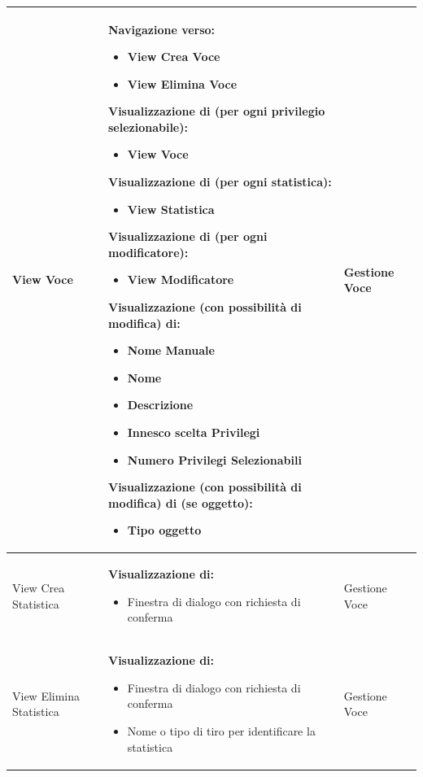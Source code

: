 \documentclass[a4paper, 11pt]{article}
\begin{document}
\begin{adjustwidth}{-1.5cm}{-1.5cm}
\begin{center}
\begin{longtable}{|p{5cm}|p{5cm}|p{5cm}|}
        View Voce & 
        \textbf{Navigazione verso:}
        \begin{itemize}
            \item View Crea Voce
            \item View Elimina Voce
        \end{itemize}
        \textbf{Visualizzazione di (per ogni privilegio selezionabile):}
        \begin{itemize}
            \item View Voce
        \end{itemize}
        \textbf{Visualizzazione di (per ogni statistica):}
        \begin{itemize}
            \item View Statistica
        \end{itemize}
        \textbf{Visualizzazione di (per ogni modificatore):}
        \begin{itemize}
            \item View Modificatore
        \end{itemize}
        \textbf{Visualizzazione (con possibilità di modifica) di:}
        \begin{itemize}
            \item Nome Manuale
            \item Nome
            \item Descrizione
            \item Innesco scelta Privilegi
            \item Numero Privilegi Selezionabili
        \end{itemize}
        \textbf{Visualizzazione (con possibilità di modifica) di (se oggetto):}
        \begin{itemize}
            \item Tipo oggetto
        \end{itemize} & 
        Gestione Voce \\ \hline
        
        View Crea Statistica & 
        \textbf{Visualizzazione di:}
        \begin{itemize}
            \item Finestra di dialogo con richiesta di conferma
        \end{itemize} &  Gestione Voce
        \\ \hline
        
        View Elimina Statistica & 
        \textbf{Visualizzazione di:}
        \begin{itemize}
            \item Finestra di dialogo con richiesta di conferma
            \item Nome o tipo di tiro per identificare la statistica
        \end{itemize} & Gestione Voce
        \\ \hline


\end{longtable}
\end{center}
\end{adjustwidth}
\end{document}
